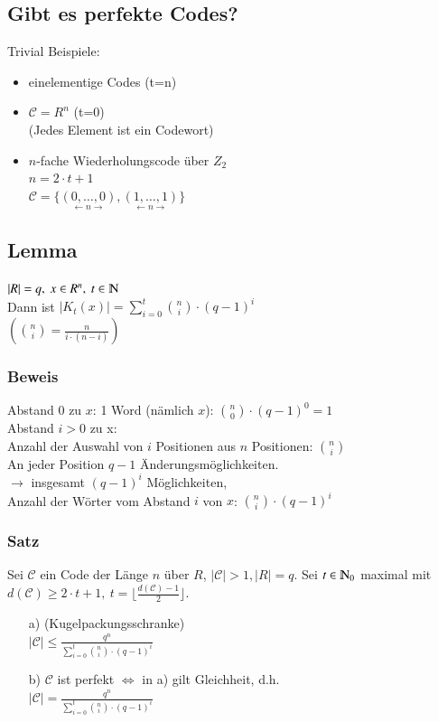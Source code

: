 \subsection{Gibt es perfekte Codes?}
Trivial Beispiele:
\begin{itemize}
	\item einelementige Codes (t=n)
	\item $\mathcal{C} = R^n$ (t=0) \\
				(Jedes Element ist ein Codewort)
	\item $n$-fache Wiederholungscode \"uber $Z_2$ \\
				$n=2 \cdot t +1$ \\
				$\mathcal{C} = \lbrace \underset{\longleftarrow n \longrightarrow}{(0,\ldots,0)},\underset{\longleftarrow n \longrightarrow}{(1,\ldots,1)}\rbrace$
\end{itemize}

\subsection{Lemma}
$\left| R \right| = q,\ x \in R^n,\ t \in \N$ \\
Dann ist $\left| K_t(x) \right| = \sum_{i=0}^t \binom{n}{i} \cdot (q-1)^i$ \\
$\left(\binom{n}{i}=\frac{n\!}{i\! \cdot (n-i)\!}\right)$

\subsubsection{Beweis}
Abstand 0 zu $x$: 1 Word (n\"amlich $x$): $\binom{n}{0} \cdot (q-1)^0 =1$ \\
Abstand $i>0$ zu x: \\
Anzahl der Auswahl von $i$ Positionen aus $n$ Positionen: $\binom{n}{i}$ \\
An jeder Position $q-1$ \"Anderungsm\"oglichkeiten. \\
$\rightarrow$ insgesamt $(q-1)^i$ M\"oglichkeiten, \\
Anzahl der W\"orter vom Abstand $i$ von $x$: $\binom{n}{i} \cdot (q-1)^i$

\subsubsection{Satz}
Sei $\mathcal{C}$ ein Code der L\"ange $n$ \"uber $R$, $\left| \mathcal{C} \right|> 1, \left|R\right| = q$. Sei $t \in \N_0$ maximal mit $d(\mathcal{C}) \geq 2 \cdot t + 1,\ t=\lfloor \frac{d(\mathcal{C})-1}{2}\rfloor$.
\begin{itemize}
	\item[a)] (Kugelpackungsschranke) \\
	$\left|\mathcal{C}\right| \leq \frac{q^n}{\sum_{i=0}^t \binom{n}{i} \cdot (q-1)^i}$
	\item[b)] $\mathcal{C}$ ist perfekt $\Leftrightarrow$ in a) gilt Gleichheit, d.h. \\
	$\left|\mathcal{C}\right| = \frac{q^n}{\sum_{i=0}^t \binom{n}{i} \cdot (q-1)^i}$
\end{itemize}

